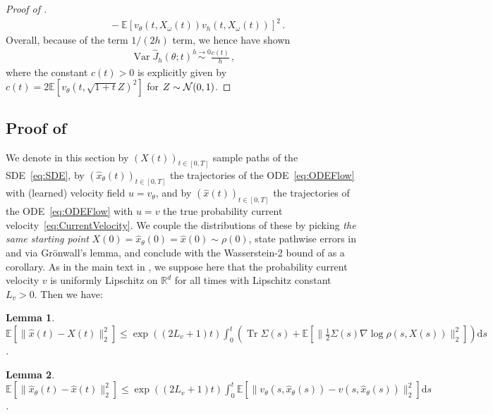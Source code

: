 \documentclass[oneside,11pt]{article}
\newtheorem{lemma}{Lemma}
\theoremstyle{remark}
\DeclareMathOperator{\Tr}{Tr}
\begin{document}
\begin{proof}[Proof of ]
\begin{align*}
    & \qquad  - \mathbb{E} \left[v_\theta(t, X_\omega(t)) v_h(t, X_\omega(t)) \right]^2\,.
\end{align*}
Overall, because of the term $1/(2h)$ term, we hence have shown
\begin{align*}
   \operatorname{Var}\widehat{J}_h(\theta;t) \overset{h \to 0}{\sim} \frac{c(t)}{h}\,,
\end{align*}
where the constant $c(t)>0$ is explicitly given by $c(t) = 2\mathbb{E} \left[v_\theta(t, \sqrt{1+t} Z)^2 \right]$ for $Z \sim {\cal N}(0,1)$.
\end{proof}















\subsection{Proof of }\label{appendix:ProofOfW2}

We denote in this section by $(X(t))_{t \in [0,T]}$ sample paths of the SDE~\eqref{eq:SDE}, by $(\hat{x}_{\theta}(t))_{t \in [0,T]}$ the trajectories of the ODE~\eqref{eq:ODEFlow} with (learned) velocity field $ u = v_\theta$, and by $(\hat{x}(t))_{t \in [0,T]}$ the trajectories of the ODE~\eqref{eq:ODEFlow} with $u = v$ the true probability current velocity~\eqref{eq:CurrentVelocity}. We couple the distributions of these by picking\textit{ the same starting point} $X(0) = \hat{x}_{\theta}(0) = \hat{x}(0) \sim \rho(0)$, state pathwise errors in  and  via Gr{\"o}nwall's lemma, and conclude with the Wasserstein-2 bound of  as a corollary. As in the main text in , we suppose here that the probability current velocity $v$ is uniformly Lipschitz on $\mathbb{R}^d$ for all times with Lipschitz constant $L_v > 0$. Then we have:

\begin{lemma} \label{lemma:exact-ode-vs-sde}
    $\mathbb{E} \left[\lVert \hat{x}(t) - X(t) \rVert_2^2 \right] \leq \exp((2 L_v + 1)t) \int_0^t \left(\Tr \Sigma(s) + \mathbb{E} \left[\lVert \tfrac{1}{2} \Sigma(s) \nabla \log \rho(s, X(s)) \rVert_2^2 \right] \right) \mathrm{d}s$.
\end{lemma}

\begin{lemma} \label{lemma:exact-ode-vs-approx-ode}
   $\mathbb{E} \left[\lVert \hat{x}_{\theta}(t) - \hat{x}(t) \rVert_2^2 \right] \leq \exp((2 L_v + 1)t) \int_0^t \mathbb{E} \left[ \lVert v_{\theta}(s, \hat{x}_{\theta}(s)) - v(s, \hat{x}_{\theta}(s)) \rVert_2^2 \right] \mathrm{d}s$.
\end{lemma}
\end{document}
